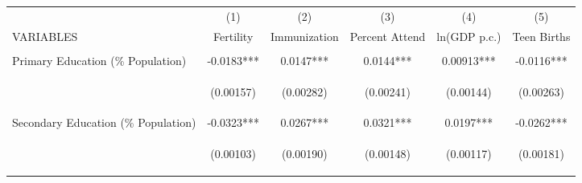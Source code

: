 \begin{landscape}
\begin{table}[htpb!]											
\begin{center}											
\begin{tabular}{lccccc}	\toprule																				
	&	(1)	&	(2)	&	(3)	&	(4)	&	(5)	\\
VARIABLES	&	Fertility	&	Immunization	&	Percent Attend	&	ln(GDP p.c.)	&	Teen Births	\\ \midrule
\vspace{4pt}	&	\begin{footnotesize}\end{footnotesize}	&	\begin{footnotesize}\end{footnotesize}	&	\begin{footnotesize}\end{footnotesize}	&	\begin{footnotesize}\end{footnotesize}	&	\begin{footnotesize}\end{footnotesize}	 \\
Primary Education (\% Population)	&	-0.0183***	&	0.0147***	&	0.0144***	&	0.00913***	&	-0.0116***	 \\
	& \begin{footnotesize}	(0.00157)	\end{footnotesize} & \begin{footnotesize}	(0.00282)	\end{footnotesize} & \begin{footnotesize}	(0.00241)	\end{footnotesize} & \begin{footnotesize}	(0.00144)	\end{footnotesize} & \begin{footnotesize}	(0.00263)	\end{footnotesize} \\
Secondary Education (\% Population)	&	-0.0323***	&	0.0267***	&	0.0321***	&	0.0197***	&	-0.0262***	 \\
	& \begin{footnotesize}	(0.00103)	\end{footnotesize} & \begin{footnotesize}	(0.00190)	\end{footnotesize} & \begin{footnotesize}	(0.00148)	\end{footnotesize} & \begin{footnotesize}	(0.00117)	\end{footnotesize} & \begin{footnotesize}	(0.00181)	\end{footnotesize} \\

\end{tabular}
\end{center}
\end{table}
\end{landscape}
